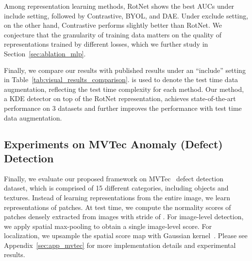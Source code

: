 \documentclass{article} \usepackage{iclr2021_conference,times}
\newcommand{\geotrans}{RotNet}
\newcommand{\contrastive}{Contrastive}
\begin{document}
Among representation learning methods, {\geotrans} shows the best AUCs under include setting, followed by {\contrastive}, BYOL, and DAE. Under exclude setting, on the other hand, {\contrastive} performs slightly better than {\geotrans}. We conjecture that the granularity of training data matters on the quality of representations trained by different losses, which we further study in Section~\ref{sec:ablation_mlp}.

Finally, we compare our results with published results under an ``include'' setting in Table~\ref{tab:visual_results_comparison}.  is used to denote the test time data augmentation, reflecting the test time complexity for each method. Our method, a KDE detector on top of the {\geotrans} representation, achieves state-of-the-art performance on 3 datasets and further improves the performance with test time data augmentation. 

\fi

\vspace{-0.1in}
\subsection{Experiments on MVTec Anomaly (Defect) Detection}
\label{sec:mvtec}
\vspace{-0.05in}

Finally, we evaluate our proposed framework on MVTec~\citep{bergmann2019mvtec} defect detection dataset, which is comprised of 15 different categories, including objects and textures.
Instead of learning representations from the entire image, we learn representations of  patches. At test time, we compute the normality scores of  patches densely extracted from  images with stride of . For image-level detection, we apply spatial max-pooling to obtain a single image-level score. For localization, we upsample the spatial score map with Gaussian kernel~\citep{liznerski2020explainable}. Please see Appendix~\ref{sec:app_mvtec} for more implementation details and experimental results.
\end{document}
